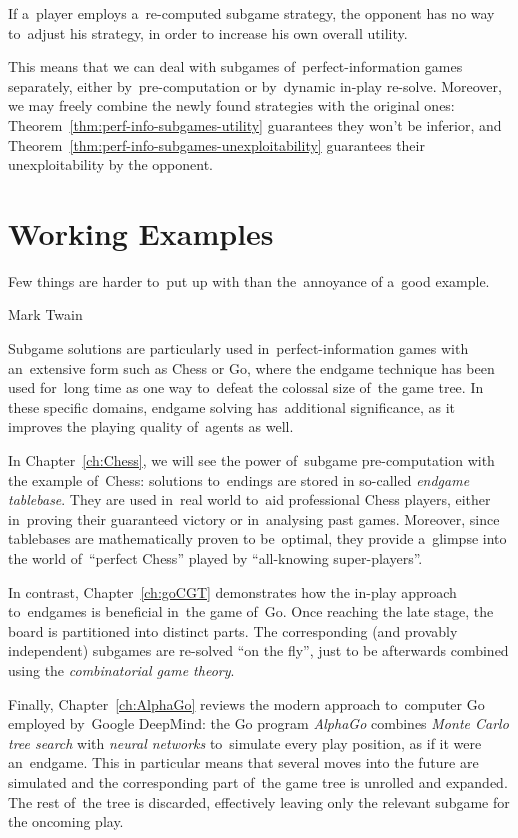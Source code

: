 \begin{cor}
  If a~player employs a~re-computed subgame strategy, the opponent has no way to~adjust his strategy, in order to increase his own overall utility.
\end{cor}

This means that we can deal with subgames of~perfect-information games separately, either by~pre-computation or by~dynamic in-play re-solve.
Moreover, we may freely combine the newly found strategies with the original ones:
Theorem~\ref{thm:perf-info-subgames-utility} guarantees they won't be inferior, and Theorem~\ref{thm:perf-info-subgames-unexploitability} guarantees their unexploitability by the opponent.


\section{Working Examples}
\epigraph{
  Few things are harder to~put up with than the~annoyance of a~good example.
}{Mark Twain}
Subgame solutions are particularly used in~perfect-information games with an~extensive form such as Chess or Go, where the endgame technique has been used for~long time as one way to~defeat the colossal size of~the game tree.
In these specific domains, endgame solving has~additional significance, as it improves the playing quality of~agents as well.

In Chapter~\ref{ch:Chess}, we will see the power of~subgame pre-computation with the example of~Chess:
solutions to~endings are stored in so-called \emph{endgame tablebase}.
They are used in~real world to~aid professional Chess players, either in~proving their guaranteed victory or in~analysing past games.
Moreover, since tablebases are mathematically proven to be~optimal, they provide a~glimpse into the world of~``perfect Chess'' played by ``all-knowing super-players''.

In contrast, Chapter~\ref{ch:goCGT} demonstrates how the in-play approach to~endgames is beneficial in~the game of~Go.
Once reaching the late stage, the board is partitioned into distinct parts.
The corresponding (and provably independent) subgames are re-solved ``on the fly'', just to be afterwards combined using the \emph{combinatorial game theory}.

Finally, Chapter~\ref{ch:AlphaGo} reviews the modern approach to~computer Go employed by~Google DeepMind:
the Go program \emph{AlphaGo} combines \emph{Monte Carlo tree search} with \emph{neural networks} to~simulate every play position, as if it were an~endgame.
This in particular means that several moves into the future are simulated and the corresponding part of~the game tree is unrolled and expanded.
The rest of~the tree is discarded, effectively leaving only the relevant subgame for the oncoming play.
